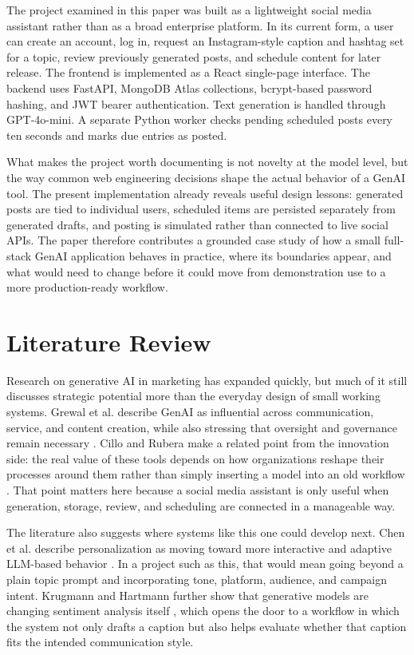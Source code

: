 \documentclass[conference]{IEEEtran}
\begin{document}
The project examined in this paper was built as a lightweight social media assistant rather than as a broad enterprise platform. In its current form, a user can create an account, log in, request an Instagram-style caption and hashtag set for a topic, review previously generated posts, and schedule content for later release. The frontend is implemented as a React single-page interface. The backend uses FastAPI, MongoDB Atlas collections, bcrypt-based password hashing, and JWT bearer authentication. Text generation is handled through GPT-4o-mini. A separate Python worker checks pending scheduled posts every ten seconds and marks due entries as posted.

What makes the project worth documenting is not novelty at the model level, but the way common web engineering decisions shape the actual behavior of a GenAI tool. The present implementation already reveals useful design lessons: generated posts are tied to individual users, scheduled items are persisted separately from generated drafts, and posting is simulated rather than connected to live social APIs. The paper therefore contributes a grounded case study of how a small full-stack GenAI application behaves in practice, where its boundaries appear, and what would need to change before it could move from demonstration use to a more production-ready workflow.

\section{Literature Review}

Research on generative AI in marketing has expanded quickly, but much of it still discusses strategic potential more than the everyday design of small working systems. Grewal et al. describe GenAI as influential across communication, service, and content creation, while also stressing that oversight and governance remain necessary \cite{grewal2025}. Cillo and Rubera make a related point from the innovation side: the real value of these tools depends on how organizations reshape their processes around them rather than simply inserting a model into an old workflow \cite{cillo2025}. That point matters here because a social media assistant is only useful when generation, storage, review, and scheduling are connected in a manageable way.

The literature also suggests where systems like this one could develop next. Chen et al. describe personalization as moving toward more interactive and adaptive LLM-based behavior \cite{chen2024}. In a project such as this, that would mean going beyond a plain topic prompt and incorporating tone, platform, audience, and campaign intent. Krugmann and Hartmann further show that generative models are changing sentiment analysis itself \cite{krugmann2024}, which opens the door to a workflow in which the system not only drafts a caption but also helps evaluate whether that caption fits the intended communication style.
\end{document}

